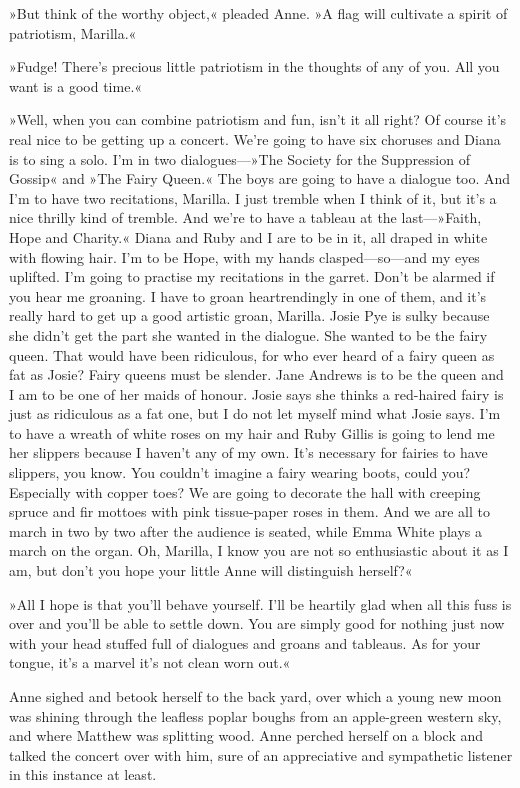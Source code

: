 »But think of the worthy object,« pleaded Anne. »A flag will cultivate a spirit of patriotism, Marilla.«

»Fudge! There's precious little patriotism in the thoughts of any of you. All you want is a good time.«

»Well, when you can combine patriotism and fun, isn't it all right? Of course it's real nice to be getting up a concert. We're going to have six choruses and Diana is to sing a solo. I'm in two dialogues—»The Society for the Suppression of Gossip« and »The Fairy Queen.« The boys are going to have a dialogue too. And I'm to have two recitations, Marilla. I just tremble when I think of it, but it's a nice thrilly kind of tremble. And we're to have a tableau at the last—»Faith, Hope and Charity.« Diana and Ruby and I are to be in it, all draped in white with flowing hair. I'm to be Hope, with my hands clasped—so—and my eyes uplifted. I'm going to practise my recitations in the garret. Don't be alarmed if you hear me groaning. I have to groan heartrendingly in one of them, and it's really hard to get up a good artistic groan, Marilla. Josie Pye is sulky because she didn't get the part she wanted in the dialogue. She wanted to be the fairy queen. That would have been ridiculous, for who ever heard of a fairy queen as fat as Josie? Fairy queens must be slender. Jane Andrews is to be the queen and I am to be one of her maids of honour. Josie says she thinks a red-haired fairy is just as ridiculous as a fat one, but I do not let myself mind what Josie says. I'm to have a wreath of white roses on my hair and Ruby Gillis is going to lend me her slippers because I haven't any of my own. It's necessary for fairies to have slippers, you know. You couldn't imagine a fairy wearing boots, could you? Especially with copper toes? We are going to decorate the hall with creeping spruce and fir mottoes with pink tissue-paper roses in them. And we are all to march in two by two after the audience is seated, while Emma White plays a march on the organ. Oh, Marilla, I know you are not so enthusiastic about it as I am, but don't you hope your little Anne will distinguish herself?«

»All I hope is that you'll behave yourself. I'll be heartily glad when all this fuss is over and you'll be able to settle down. You are simply good for nothing just now with your head stuffed full of dialogues and groans and tableaus. As for your tongue, it's a marvel it's not clean worn out.«

Anne sighed and betook herself to the back yard, over which a young new moon was shining through the leafless poplar boughs from an apple-green western sky, and where Matthew was splitting wood. Anne perched herself on a block and talked the concert over with him, sure of an appreciative and sympathetic listener in this instance at least.

